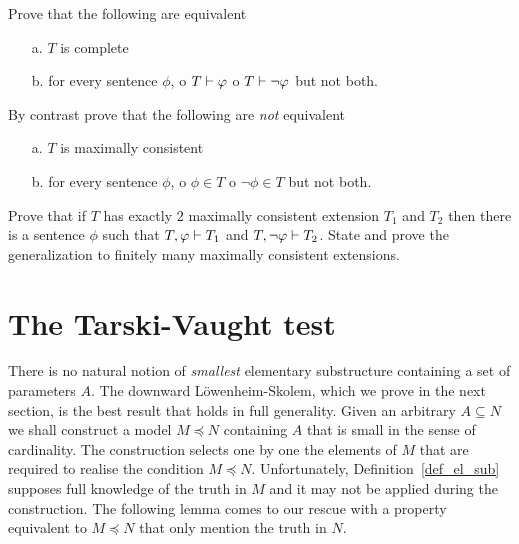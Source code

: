 \begin{exercise}\label{ex_max_cons_compl}
Prove that the following are equivalent
\begin{itemize}
\item[a.] $T$ is complete
\item[b.] for every sentence $\phi$, o $T\vdash\varphi$ o  $T\vdash\neg\varphi$ but not both.
\end{itemize}
By contrast prove that the following are \textit{not\/} equivalent
\begin{itemize}
\item[a.] $T$ is maximally consistent
\item[b.] for every sentence $\phi$, o $\phi\in T$ o  $\neg\phi\in T$ but not both.
\end{itemize}
\end{exercise}

\begin{exercise}\label{ex_2max_cons_ext}
Prove that if $T$ has exactly $2$ maximally consistent extension $T_1$ and $T_2$ then there is a sentence $\phi$ such that $T,\varphi\vdash T_1$ and $T,\neg\varphi\vdash T_2$.
State and prove the generalization to finitely many maximally consistent extensions.
\end{exercise} 




\section{The Tarski-Vaught test}

There is no natural notion of \textit{smallest\/} elementary substructure containing a set of parameters $A$.
The downward L\"owenheim-Skolem, which we prove in the next section, is the best result that holds in full generality.
Given an arbitrary $A\subseteq N$ we shall construct a model $M\preceq N$ containing $A$ that is small in the sense of cardinality.
The construction selects one by one the elements of $M$ that are required to realise the condition $M\preceq N$.
Unfortunately, Definition~\ref{def_el_sub} supposes full knowledge of the truth in $M$ and it may not be applied during the construction.
The following lemma comes to our rescue with a property equivalent to $M\preceq N$ that only mention the truth in $N$.

